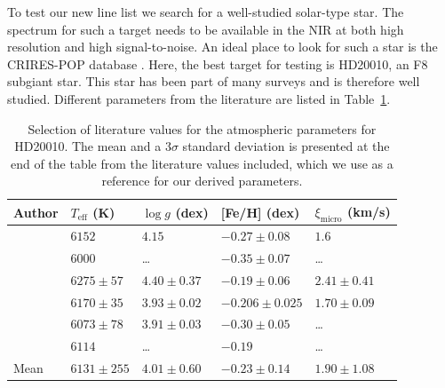 \documentclass{aa}
\begin{document}
To test our new line list we search for a well-studied solar-type
star. The spectrum for such a target needs to be available in the NIR at
both high resolution and high signal-to-noise. An ideal place to look
for such a star is the CRIRES-POP database \citep{Lebzelter2012}. Here,
the best target for testing is HD20010, an F8 subgiant star. This star
has been part of many surveys and is therefore well studied. Different
parameters from the literature are listed in Table~\ref{tab:parameters}.

\begin{table}[htb!]
    \caption{Selection of literature values for the atmospheric
    parameters for HD20010. The mean and a $3 \sigma$ standard
    deviation is presented at the end of the table from the literature
    values included, which we use as a reference for our
    derived parameters.}
    \label{tab:parameters}
    \centering
    \begin{tabular}{l|llll}
      \hline\hline
     Author                 & $T_\mathrm{eff}$ (K) & $\log g$ (dex)  &  [Fe/H] (dex)    & $\xi_\mathrm{micro}$ (km/s)  \\
      \hline
    \cite{Balachandran1990} & $6152$               & $4.15$          & $-0.27\pm0.08$   & $1.6$                        \\
    \cite{Favata1997}       & $6000$               & \ldots          & $-0.35\pm0.07$   & \ldots                       \\
    \cite{Santos2004}       & $6275\pm57$          & $4.40\pm0.37$   & $-0.19\pm0.06$   & $2.41\pm0.41$                \\
    \cite{Gonzalez2010}     & $6170\pm35$          & $3.93\pm0.02$   & $-0.206\pm0.025$ & $1.70\pm0.09$                \\
    \cite{Ramirez2012}      & $6073\pm78$          & $3.91\pm0.03$   & $-0.30\pm0.05$   & \ldots                       \\
    \cite{Mortier2013}      & $6114$               & \ldots          & $-0.19$          & \ldots                       \\
      \hline
      Mean                  & $6131\pm255$         & $4.01\pm0.60$   & $-0.23\pm0.14$   & $1.90\pm1.08$                \\
      \hline
    \end{tabular}
\end{table}
\end{document}
